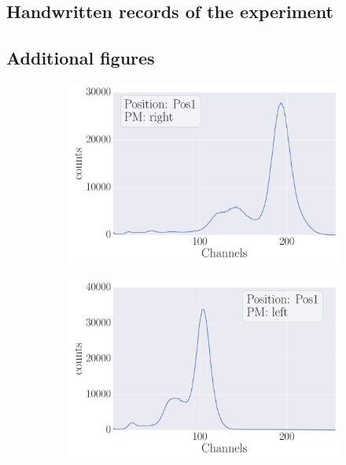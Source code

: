 \subsection{Handwritten records of the experiment}
\clearpage
\subsection{Additional figures}
\begin{figure}
    \begin{subfigure}[b]{\picwidth}
        \includegraphics[width=\textwidth]{analysis/figures/plot2_1a}
        \caption{}
    \end{subfigure}\qquad
    \begin{subfigure}[b]{\picwidth}
        \includegraphics[width=\textwidth]{analysis/figures/plot2_1b}
        \caption{}
    \end{subfigure}

\end{figure}
